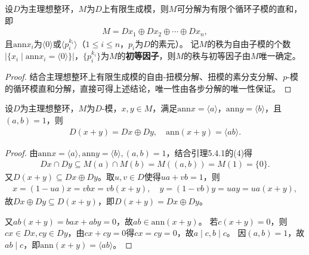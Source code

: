 \documentclass[../../main.tex]{subfiles}%
\begin{document}
\begin{theorem}
设$D$为主理想整环，$M$为$D$上有限生成模，则$M$可分解为有限个循环子模的直和，即
\begin{align*}
M=Dx_1\oplus Dx_2\oplus\cdots\oplus Dx_n,
\end{align*}
且$\mathrm{ann}x_i$为$\langle0\rangle$或$\langle p_i^{k_i}\rangle$（$1\leqslant i\leqslant n$，$p_i$为$D$的素元）。
记$M$的秩为自由子模的个数$|\{x_i\mid \mathrm{ann}x_i=\langle0\rangle\}|$，$\{p_i^{k_i}\}$为$M$的\textbf{初等因子}，则$M$的秩与初等因子由$M$唯一确定。
\end{theorem}
\begin{proof}

结合主理想整环上有限生成模的自由-扭模分解、扭模的素分支分解、$p$-模的循环模直和分解，直接可得上述结论，唯一性由各步分解的唯一性保证。

\end{proof}

\begin{lemma}
设$D$为主理想整环，$M$为$D$-模，$x,y\in M$，满足$\mathrm{ann}x=\langle a\rangle$，$\mathrm{ann}y=\langle b\rangle$，且$(a,b)=1$，则
\begin{align*}
D(x+y)=Dx\oplus Dy,\quad \mathrm{ann}(x+y)=\langle ab\rangle.
\end{align*}
\end{lemma}
\begin{proof}

由$\mathrm{ann}x=\langle a\rangle,\mathrm{ann}y=\langle b\rangle,(a,b)=1$，结合引理5.4.1的(4)得
\begin{align*}
Dx\cap Dy\subseteq M(a)\cap M(b)=M((a,b))=M(1)=\{0\}.
\end{align*}
又$D(x+y)\subseteq Dx\oplus Dy$。取$u,v\in D$使得$ua+vb=1$，则
\begin{align*}
x=(1-ua)x=vbx=vb(x+y),\quad y=(1-vb)y=uay=ua(x+y),
\end{align*}
故$Dx\oplus Dy\subseteq D(x+y)$，即$D(x+y)=Dx\oplus Dy$。

又$ab(x+y)=bax+aby=0$，故$ab\in\mathrm{ann}(x+y)$。
若$c(x+y)=0$，则$cx\in Dx,cy\in Dy$，由$cx+cy=0$得$cx=cy=0$，故$a\mid c,b\mid c$。
因$(a,b)=1$，故$ab\mid c$，即$\mathrm{ann}(x+y)=\langle ab\rangle$。

\end{proof}
\end{document}
